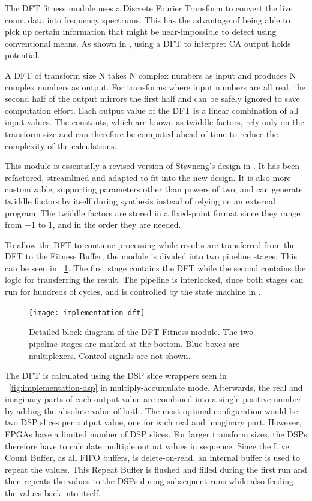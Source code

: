 The DFT fitness module uses a Discrete Fourier Transform to convert the live count data into frequency spectrums.
This has the advantage of being able to pick up certain information that might be near-impossible to detect using conventional means.
As shown in , using a DFT to interpret CA output holds potential.

A DFT of transform size N takes N complex numbers as input and produces N complex numbers as output.
For transforms where input numbers are all real, the second half of the output mirrors the first half and can be safely ignored to save computation effort.
Each output value of the DFT is a linear combination of all input values.
The constants, which are known as twiddle factors, rely only on the transform size and can therefore be computed ahead of time to reduce the complexity of the calculations.
\CN

This module is essentially a revised version of Støvneng's design in \cite{stovneng2014sblock}.
It has been refactored, streamlined and adapted to fit into the new design.
It is also more customizable, supporting parameters other than powers of two, and can generate twiddle factors by itself during synthesis instead of relying on an external program.
The twiddle factors are stored in a fixed-point format since they range from $-1$ to $1$, and in the order they are needed.

To allow the DFT to continue processing while results are transferred from the DFT to the Fitness Buffer, the module is divided into two pipeline stages.
This can be seen in \figurename~\ref{fig:implementation-dft}.
The first stage contains the DFT while the second contains the logic for transferring the result.
The pipeline is interlocked, since both stages can run for hundreds of cycles, and is controlled by the state machine in .

\begin{figure}[!ht]
    \centering
    \texttt{[image: implementation-dft]}
    \caption[DFT Fitness]{
        Detailed block diagram of the DFT Fitness module.
        The two pipeline stages are marked at the bottom.
        Blue boxes are multiplexers.
        Control signals are not shown.
    }
    \label{fig:implementation-dft}
\end{figure}

The DFT is calculated using the DSP slice wrappers seen in \figurename~\ref{fig:implementation-dsp} in multiply-accumulate mode.
Afterwards, the real and imaginary parts of each output value are combined into a single positive number by adding the absolute value of both.
The most optimal configuration would be two DSP slices per output value, one for each real and imaginary part.
However, FPGAs have a limited number of DSP slices.
For larger transform sizes, the DSPs therefore have to calculate multiple output values in sequence.
Since the Live Count Buffer, as all FIFO buffers, is delete-on-read, an internal buffer is used to repeat the values.
This Repeat Buffer is flushed and filled during the first run and then repeats the values to the DSPs during subsequent runs while also feeding the values back into itself.

